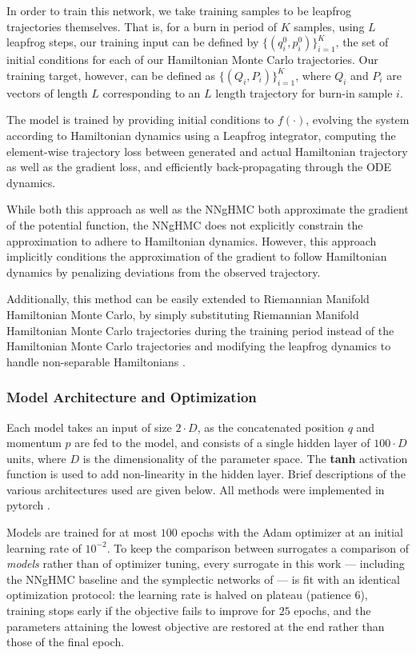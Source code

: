 \documentclass{article}
\theoremstyle{plain}
\theoremstyle{definition}
\theoremstyle{remark}
\begin{document}
In order to train this network, we take training samples to be leapfrog trajectories themselves. That is, for a burn in period of $K$ samples, using $L$ leapfrog steps, our training input can be defined by $\{(q_i^0, p_i^0)\}_{i=1}^{K}$, the set of initial conditions for each of our Hamiltonian Monte Carlo trajectories. Our training target, however, can be defined as $\{(Q_i, P_i)\}_{i=1}^{K}$, where $Q_i$ and $P_i$ are vectors of length $L$ corresponding to an $L$ length trajectory for burn-in sample $i$. 

The model is trained by providing initial conditions to $f( \cdot )$, evolving the system according to Hamiltonian dynamics using a Leapfrog integrator, computing the element-wise trajectory loss between generated and actual Hamiltonian trajectory as well as the gradient loss, and efficiently back-propagating through the ODE dynamics. 

 While both this approach as well as the NNgHMC both approximate the gradient of the potential function, the NNgHMC does not explicitly constrain the approximation to adhere to Hamiltonian dynamics. However, this approach implicitly conditions the approximation of the gradient to follow Hamiltonian dynamics by penalizing deviations from the observed trajectory. 

Additionally, this method can be easily extended to Riemannian Manifold Hamiltonian Monte Carlo, by simply substituting Riemannian Manifold Hamiltonian Monte Carlo trajectories during the training period instead of the Hamiltonian Monte Carlo trajectories and modifying the leapfrog dynamics to handle non-separable Hamiltonians \cite{Tao_2016}. 

\subsubsection{Model Architecture and Optimization}
\label{sec:ode-training}
Each model takes an input of size $2 \cdot D$, as the concatenated position $q$
and momentum $p$ are fed to the model, and consists of a single hidden layer of
$100 \cdot D$ units, where $D$ is the dimensionality of the parameter space. The
\textbf{tanh} activation function is used to add non-linearity in the hidden
layer. Brief descriptions of the various architectures used are given below.
All methods were implemented in pytorch \cite{paszke2019pytorch}.

Models are trained for at most $100$ epochs with the Adam optimizer at an
initial learning rate of $10^{-2}$. To keep the comparison between surrogates
a comparison of \emph{models} rather than of optimizer tuning, every surrogate
in this work --- including the NNgHMC baseline and the symplectic networks of
 --- is fit with an identical optimization protocol:
the learning rate is halved on plateau (patience $6$), training stops early if
the objective fails to improve for $25$ epochs, and the parameters attaining
the lowest objective are restored at the end rather than those of the final
epoch.
\end{document}
